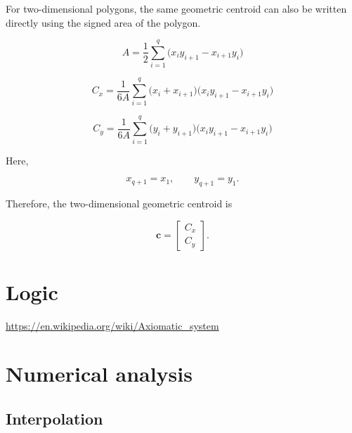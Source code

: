 \documentclass{book}
\begin{document}
        For two-dimensional polygons, the same geometric centroid can also be written
        directly using the signed area of the polygon.
        
        \[
            A
            =
            \frac{1}{2}
            \sum_{i=1}^{q}
            \big(
            x_i y_{i+1}
            -
            x_{i+1} y_i
            \big)
        \]
        
        \[
            C_x
            =
            \frac{1}{6A}
            \sum_{i=1}^{q}
            \big(
            x_i + x_{i+1}
            \big)
            \big(
            x_i y_{i+1}
            -
            x_{i+1} y_i
            \big)
        \]
        
        \[
            C_y
            =
            \frac{1}{6A}
            \sum_{i=1}^{q}
            \big(
            y_i + y_{i+1}
            \big)
            \big(
            x_i y_{i+1}
            -
            x_{i+1} y_i
            \big)
        \]
        
        Here,
        
        \[
            x_{q+1} = x_1,
            \qquad
            y_{q+1} = y_1.
        \]
        
        Therefore, the two-dimensional geometric centroid is
        
        \[
            \mathbf{c}
            =
            \begin{bmatrix}
                C_x \\
                C_y
            \end{bmatrix}.
        \]

%	
%

\section{Logic}


\url{https://en.wikipedia.org/wiki/Axiomatic_system}

\section{Numerical analysis}

\subsection{Interpolation}
\end{document}
